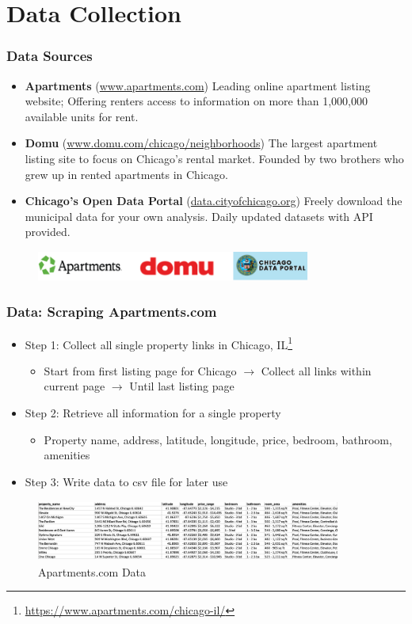 \documentclass{beamer}
\begin{document}
\section{Data Collection}

\begin{frame}
	\frametitle{Data Sources}
	\begin{itemize}
		\item \textbf{Apartments} (\url{www.apartments.com}) \newline Leading online apartment listing website; Offering renters access to information on more than 1,000,000 available units for rent.
		\item \textbf{Domu} (\url{www.domu.com/chicago/neighborhoods}) \newline The largest apartment listing site to focus on Chicago’s rental market. Founded by two brothers who grew up in rented apartments in Chicago.
		\item \textbf{Chicago's Open Data Portal} (\url{data.cityofchicago.org}) \newline Freely download the municipal data for your own analysis. Daily updated datasets with API provided.
	\end{itemize}
	\begin{figure}[H]
		\centering
		\includegraphics[height=1cm, width=9cm]{figs/data_source.png}
	\end{figure}
\end{frame}


\begin{frame}
	\frametitle{Data: Scraping Apartments.com}
	\begin{itemize}
		\item Step 1: Collect all single property links in Chicago, IL\footnote{\url{https://www.apartments.com/chicago-il/}}
		\begin{itemize}
			\item Start from first listing page for Chicago $\rightarrow$ Collect all links within current page $\rightarrow$ Until last listing page
		\end{itemize}
		\item Step 2: Retrieve all information for a single property
		\begin{itemize}
			\item Property name, address, latitude, longitude, price, bedroom, bathroom, amenities
		\end{itemize}
		\item Step 3: Write data to csv file for later use
	\end{itemize}
	\begin{figure}[H]
		\centering
		\includegraphics[height=2cm, width=10cm]{figs/apartmentsdata.png}
		\caption{Apartments.com Data}
	\end{figure}
\end{frame}
\end{document}
